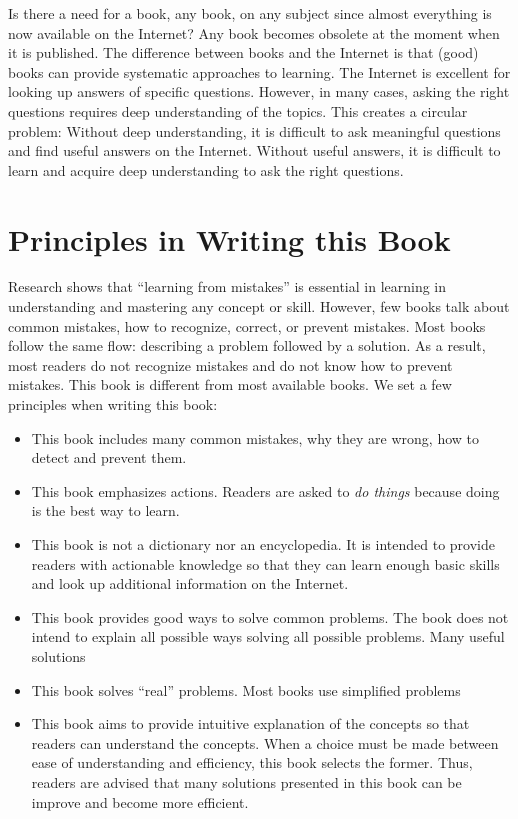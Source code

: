 Is there a need for a book, any book, on any subject since almost
everything is now available on the Internet?  Any book becomes
obsolete at the moment when it is published.  The difference between
books and the Internet is that (good) books can provide systematic
approaches to learning. The Internet is excellent for looking up
answers of specific questions. However, in many cases, asking the
right questions requires deep understanding of the topics.  This
creates a circular problem: Without deep understanding, it is
difficult to ask meaningful questions and find useful answers on the
Internet. Without useful answers, it is difficult to learn and acquire
deep understanding to ask the right questions.

\section*{Principles in Writing this Book}

Research shows that ``learning from mistakes'' is essential in
learning in understanding and mastering any concept or skill.
However, few books talk about common mistakes, how to recognize,
correct, or prevent mistakes.  Most books follow the same flow:
describing a problem followed by a solution.  As a result, most
readers do not recognize mistakes and do not know how to prevent
mistakes.  This book is different from most available books.  We set a
few principles when writing this book:

\begin{itemize}
\item This book includes many common mistakes, why they are wrong, how
  to detect and prevent them.
  
\item This book emphasizes actions. Readers are asked to {\it do
  things} because doing is the best way to learn.

\item This book is not a dictionary nor an encyclopedia.
  It is intended to provide readers with actionable
  knowledge so that they can learn enough basic skills
  and look up additional information on the Internet.

\item This book provides good ways to solve common problems.
  The book does not intend to explain all possible ways
  solving all possible problems. Many useful solutions

\item This book solves ``real'' problems.  Most books
  use simplified problems

\item This book aims to provide intuitive explanation of the concepts
  so that readers can understand the concepts.  When a choice must be
  made between ease of understanding and efficiency, this book selects
  the former.  Thus, readers are advised that many solutions presented
  in this book can be improve and become more efficient.
  
\end{itemize}

